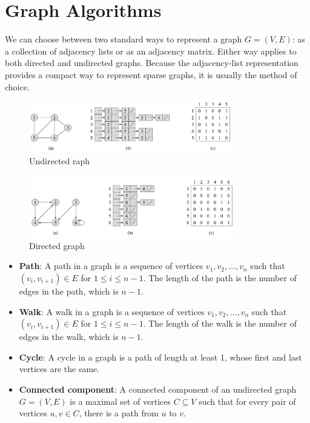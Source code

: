 
\chapter{Graph Algorithms}


We can choose between two standard ways to represent a graph $G = (V,E)$:
as a collection of adjacency lists or as an adjacency matrix. Either way applies
to both directed and undirected graphs. Because the adjacency-list representation
provides a compact way to represent sparse graphs, it is usually the method of choice.

\begin{figure}[H]
    \centering
    \includegraphics[width=0.8\textwidth]{assets/undirected_graph.png}
    \caption{Undirected raph}
    \label{fig:undirected_graph}
\end{figure}

\begin{figure}[H]
    \centering
    \includegraphics[width=0.8\textwidth]{assets/directed_graph.png}
    \caption{Directed graph}
    \label{fig:directed_graph}
\end{figure}

\begin{itemize}
    \item \textbf{Path}: A path in a graph is a sequence of vertices $v_1, v_2, \ldots, v_n$ such that $(v_i, v_{i+1}) \in E$ for $1 \leq i \leq n - 1$. The length of the path is the number of edges in the path, which is $n - 1$.
    \item \textbf{Walk}: A walk in a graph is a sequence of vertices $v_1, v_2, \ldots, v_n$ such that $(v_i, v_{i+1}) \in E$ for $1 \leq i \leq n - 1$. The length of the walk is the number of edges in the walk, which is $n - 1$.
    \item \textbf{Cycle}: A cycle in a graph is a path of length at least 1, whose first and last vertices are the same.
    \item \textbf{Connected component}: A connected component of an undirected graph $G = (V, E)$ is a maximal set of vertices $C \subseteq V$ such that for every pair of vertices $u, v \in C$, there is a path from $u$ to $v$.
\end{itemize}


